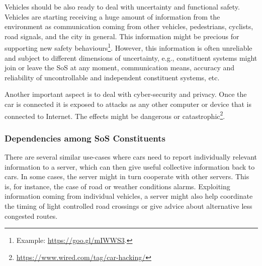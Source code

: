 Vehicles should be also ready to deal with uncertainty and functional safety. Vehicles are starting receiving a huge amount of information from the environment as communication coming from other vehicles, pedestrians, cyclists, road signals, and the city in general. This information might be precious for supporting new safety behaviours\footnote{Example: \url{https://goo.gl/mIWWS3}.}.  %
However, this information is often unreliable and subject to different dimensions of uncertainty, e.g., constituent systems might join or leave the SoS at any moment, communication means, accuracy and reliability of uncontrollable and independent constituent systems, etc.



Another important aspect is to deal with cyber-security and privacy. Once the car is connected it is exposed to attacks as any other computer or device that is connected to Internet. The effects might be dangerous or catastrophic\footnote{\url{https://www.wired.com/tag/car-hacking/}}.



\subsubsection{Dependencies among SoS Constituents}
There are several similar use-cases where cars need to report individually relevant information to a server, which can then give useful collective information back to cars. In some cases, the server might in turn cooperate with other servers. This is, for instance, the case of road or weather conditions alarms. Exploiting information coming from individual vehicles, a server might also help coordinate the timing of light controlled road crossings or give advice about alternative less congested routes.

